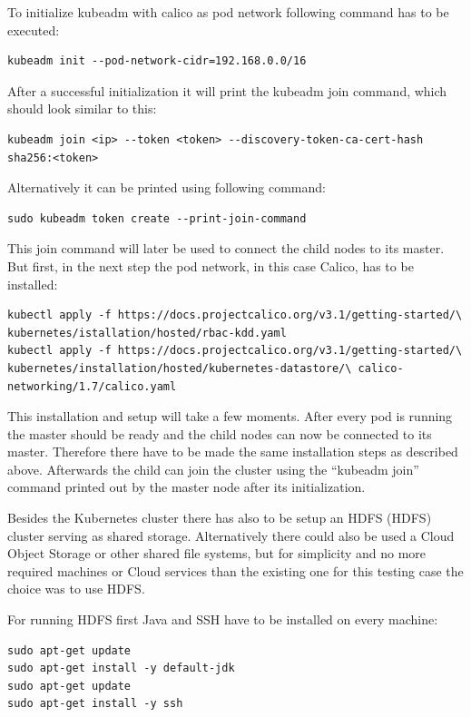 To initialize kubeadm with calico as pod network following command has to be executed:
\begin{lstlisting}[caption={Initialize Kubernetes master},captionpos=b]
kubeadm init --pod-network-cidr=192.168.0.0/16
\end{lstlisting}
After a successful initialization it will print the kubeadm join command, which should look similar to this:
\begin{lstlisting}[caption={Kubernetes join command},captionpos=b]
kubeadm join <ip> --token <token> --discovery-token-ca-cert-hash sha256:<token>
\end{lstlisting}
Alternatively it can be printed using following command:
\begin{lstlisting}[caption={Kubernetes print join command},captionpos=b]
sudo kubeadm token create --print-join-command 
\end{lstlisting}
This join command will later be used to connect the child nodes to its master. But first, in the next step the pod network, in this case Calico, has to be installed:
\begin{lstlisting}[caption={Install pod network for Kubernetes cluster},captionpos=b]
kubectl apply -f https://docs.projectcalico.org/v3.1/getting-started/\ kubernetes/istallation/hosted/rbac-kdd.yaml
kubectl apply -f https://docs.projectcalico.org/v3.1/getting-started/\ kubernetes/installation/hosted/kubernetes-datastore/\ calico-networking/1.7/calico.yaml
\end{lstlisting}

This installation and setup will take a few moments. After every pod is running the master should be ready and the child nodes can now be connected to its master. Therefore there have to be made the same installation steps as described above. Afterwards the child can join the cluster using the ``kubeadm join'' command printed out by the master node after its initialization.

Besides the Kubernetes cluster there has also to be setup an \acs{HDFS} (\acl{HDFS}) cluster serving as shared storage. Alternatively there could also be used a Cloud Object Storage or other shared file systems, but for simplicity and no more required machines or Cloud services than the existing one for this testing case the choice was to use HDFS.

For running HDFS first Java and \acs{SSH} have to be installed on every machine:
\begin{lstlisting}[caption={HDFS requirements installation},captionpos=b]
sudo apt-get update
sudo apt-get install -y default-jdk
sudo apt-get update
sudo apt-get install -y ssh
\end{lstlisting}

